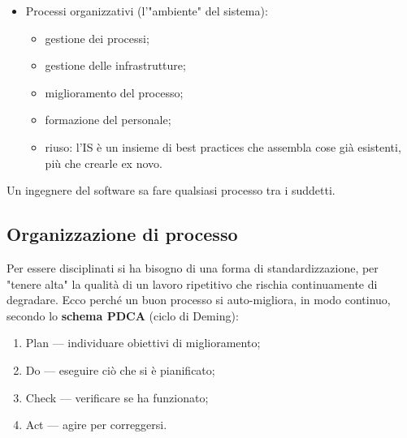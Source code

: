 \documentclass[a4paper]{article}
\begin{document}
\begin{itemize}
\begin{itemize}
	\end{itemize}

			
			
	\item Processi organizzativi (l'"ambiente" del sistema):
				
	\begin{itemize}
		
					
	\item gestione dei processi;
					
	\item gestione delle infrastrutture;
					
	\item miglioramento del processo;
					
	\item formazione del personale;
					
	\item riuso: l'IS è un insieme di best practices che assembla cose già esistenti, più che crearle ex novo. %

				
	\end{itemize}

			
		
	\end{itemize}

		
Un ingegnere del software sa fare qualsiasi processo tra i suddetti.

		
	\subsection{Organizzazione di processo}

		
Per essere disciplinati si ha bisogno di una forma di standardizzazione, per "tenere alta" la qualità di un lavoro ripetitivo che rischia continuamente di degradare. Ecco perché un buon processo si auto-migliora, in modo continuo, secondo lo \textbf{schema PDCA} (ciclo di Deming):
		
	\begin{enumerate}
		
			
	\item Plan — individuare obiettivi di miglioramento;
			
	\item Do — eseguire ciò che si è pianificato;
			
	\item Check — verificare se ha funzionato;
			
	\item Act — agire per correggersi.
		
	\end{enumerate}
\end{document}

